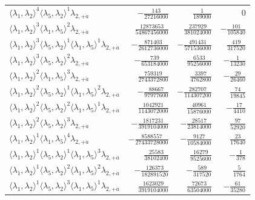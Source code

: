 \begin{longtable}{@{}lrrr@{}}
$\langle\lambda_1,\lambda_2\rangle^{4}\langle\lambda_5,\lambda_2\rangle^{1}\lambda_{2,+\dot a}$ & $-\frac{143}{27216000}$ & $\frac{1}{189000}$ & $0$ \\
$\langle\lambda_1,\lambda_2\rangle^{3}\langle\lambda_1,\lambda_5\rangle^{2}\lambda_{2,+\dot a}$ & $\frac{12873653}{54867456000}$ & $\frac{237929}{381024000}$ & $-\frac{101}{105840}$ \\
$\langle\lambda_1,\lambda_2\rangle^{3}\langle\lambda_5,\lambda_2\rangle^{1}\langle\lambda_1,\lambda_5\rangle^{1}\lambda_{2,+\dot a}$ & $-\frac{871403}{2612736000}$ & $-\frac{491431}{571536000}$ & $\frac{419}{317520}$ \\
$\langle\lambda_1,\lambda_2\rangle^{3}\langle\lambda_5,\lambda_2\rangle^{2}\lambda_{2,+\dot a}$ & $-\frac{739}{653184000}$ & $\frac{6533}{95256000}$ & $-\frac{1}{13230}$ \\
$\langle\lambda_1,\lambda_2\rangle^{2}\langle\lambda_1,\lambda_5\rangle^{3}\lambda_{2,+\dot a}$ & $\frac{759319}{2743372800}$ & $\frac{3397}{4762800}$ & $-\frac{29}{26460}$ \\
$\langle\lambda_1,\lambda_2\rangle^{2}\langle\lambda_5,\lambda_2\rangle^{1}\langle\lambda_1,\lambda_5\rangle^{2}\lambda_{2,+\dot a}$ & $-\frac{88667}{97977600}$ & $-\frac{282707}{114307200}$ & $\frac{74}{19845}$ \\
$\langle\lambda_1,\lambda_2\rangle^{2}\langle\lambda_5,\lambda_2\rangle^{2}\langle\lambda_1,\lambda_5\rangle^{1}\lambda_{2,+\dot a}$ & $\frac{1042921}{1143072000}$ & $\frac{40961}{15876000}$ & $-\frac{17}{4410}$ \\
$\langle\lambda_1,\lambda_2\rangle^{2}\langle\lambda_5,\lambda_2\rangle^{3}\lambda_{2,+\dot a}$ & $-\frac{1817231}{3919104000}$ & $-\frac{28517}{23814000}$ & $\frac{97}{52920}$ \\
$\langle\lambda_1,\lambda_2\rangle^{1}\langle\lambda_1,\lambda_5\rangle^{4}\lambda_{2,+\dot a}$ & $-\frac{8588557}{27433728000}$ & $-\frac{9127}{10584000}$ & $\frac{23}{17640}$ \\
$\langle\lambda_1,\lambda_2\rangle^{1}\langle\lambda_5,\lambda_2\rangle^{1}\langle\lambda_1,\lambda_5\rangle^{3}\lambda_{2,+\dot a}$ & $\frac{25583}{38102400}$ & $\frac{16279}{9525600}$ & $-\frac{1}{378}$ \\
$\langle\lambda_1,\lambda_2\rangle^{1}\langle\lambda_5,\lambda_2\rangle^{2}\langle\lambda_1,\lambda_5\rangle^{2}\lambda_{2,+\dot a}$ & $-\frac{126373}{182891520}$ & $-\frac{589}{317520}$ & $\frac{5}{1764}$ \\
$\langle\lambda_1,\lambda_2\rangle^{1}\langle\lambda_5,\lambda_2\rangle^{3}\langle\lambda_1,\lambda_5\rangle^{1}\lambda_{2,+\dot a}$ & $\frac{1623029}{3919104000}$ & $\frac{72673}{63504000}$ & $-\frac{61}{35280}$ \\

\end{longtable}
